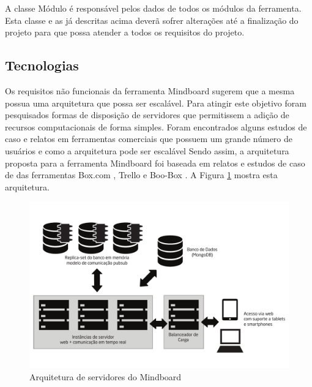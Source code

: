 A classe Módulo é responsável pelos dados de todos os módulos da ferramenta. Esta classe e as já descritas acima deverã sofrer alterações até a finalização do projeto para que possa atender a todos os requisitos do projeto. 

\subsection{Tecnologias}
\label{sec:tecnologias}

Os requisitos não funcionais da ferramenta Mindboard sugerem que a mesma possua uma arquitetura que possa ser escalável. Para atingir este objetivo foram pesquisados formas de disposição de servidores que permitissem a adição de recursos computacionais de forma simples. Foram encontrados alguns estudos de caso e relatos em ferramentas comerciais que possuem um grande número de usuários e como a arquitetura pode ser escalável Sendo assim, a arquitetura proposta para a ferramenta Mindboard foi baseada em relatos e estudos de caso de das ferramentas Box.com \cite{boxcom}, Trello \cite{trello} e Boo-Box \cite{boobox}. A Figura \ref{fig:arquitetura} mostra esta arquitetura.

\begin{figure}[!h]
\centering
\includegraphics[width=1.0\textwidth]{pdfs/img-arquitetura-lb.pdf} 
\caption{Arquitetura de servidores do Mindboard}
\label{fig:arquitetura} 
\end{figure}

